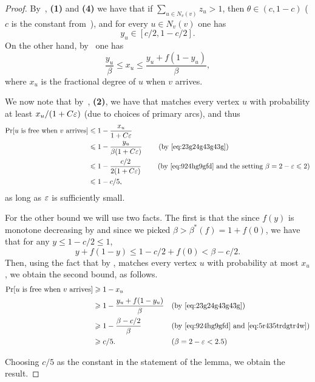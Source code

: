 \begin{proof}
	By~, {\bf (1)} and {\bf (4)} we have that if $\sum_{u\in N_v(v)} z_u> 1$, then $\theta\in (c, 1-c)$ ($c$ is the constant from~), and for every $u\in N_v(v)$ one has 
	\begin{equation}\label{eq:924hg9gfd}
	y_u\in [c/2, 1-c/2].
	\end{equation} 
	On the other hand, by~ one has 
	\begin{equation}\label{eq:23g24g43g43g}
	\frac{y_u}{\beta} \leq	x_u  \leq \frac{y_u + f(1-y_u)}{\beta},
	\end{equation}
	where $x_u$ is the fractional degree of $u$ when $v$ arrives.
	
	We now note that by~, {\bf (2)}, we have that  matches every vertex $u$ with probability at least $x_u/(1+C\varepsilon)$ (due to choices of primary arcs), and thus
	\begin{equation*}
	\begin{split}
	\Pr[\mbox{$u$ is free when $v$ arrives}]&\leqslant 1-\frac{x_u}{1+C\varepsilon}\\
	&\leqslant 1-\frac{y_u}{\beta(1+C\varepsilon)}\text{~~~~~~~(by~\eqref{eq:23g24g43g43g})}\\
	&\leqslant 1-\frac{c/2}{2(1+C\varepsilon)}\text{~~~~~~~(by~\eqref{eq:924hg9gfd} and the setting $\beta=2-\varepsilon\leqslant 2$)}\\
	&\leqslant 1 - c/5,
	\end{split}
	\end{equation*}
	as long as $\varepsilon$ is sufficiently small.
	
	For the other bound we will use two facts. The first is that the since $f(y)$ is monotone decreasing by  and since we picked $\beta>\beta^*(f) = 1+f(0)$, we have that for any $y\leq 1-c/2\leq 1$, 
	\begin{equation}\label{eq:5r435trdgtr4w}
	y+f(1-y)\leq 1-c/2+f(0) < \beta - c/2.
	\end{equation}
	Then, using the fact that by ,  matches every vertex $u$ with probability at most $x_u$, we obtain the second bound, as follows.
	\begin{align*}
	\Pr[\mbox{$u$ is free when $v$ arrives}]&\geqslant 1-x_u && \\
	&\geqslant 1-\frac{y_u + f(1-y_u)}{\beta} && \mbox{(by~\eqref{eq:23g24g43g43g})}\\
	&\geqslant 1-\frac{\beta-c/2}{\beta} && \mbox{(by~\eqref{eq:924hg9gfd} and \eqref{eq:5r435trdgtr4w})}\\
	& \geqslant c/5. && \mbox{($\beta=2-\varepsilon<2.5$)}
	\end{align*}
	
	Choosing $c/5$ as the constant in the statement of the lemma, we obtain the result.
\end{proof}

